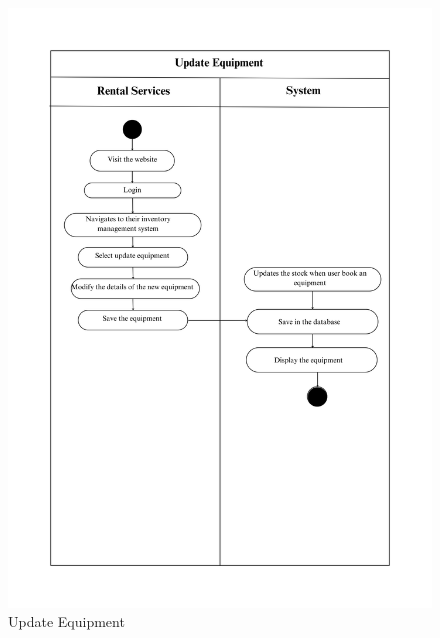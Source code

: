 \begin{figure}[h!]
    \centering
    \includegraphics[width=1\textwidth]{Images/Activity Diagrams/21 Update Equipment.png}
    \caption{Update Equipment}
    \label{fig:activity-update-equ}
\end{figure}

